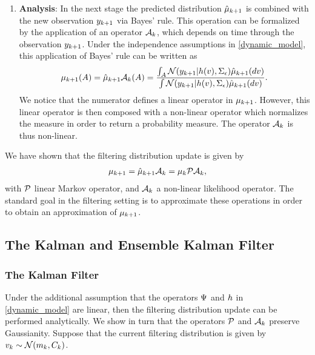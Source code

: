 \documentclass[12pt]{article}
\begin{document}
\begin{enumerate}
\item \textbf{Analysis}: In the next stage the predicted distribution $\predictMeas[\timeStep+1]$ is combined with the new observation $\ddataObs[\timeStep+1]$ via Bayes' rule.
This operation can be formalized by the application of an operator $\analysisOp$, which depends on time through the observation $\ddataObs[\timeStep+1]$. Under the independence 
assumptions in \ref{dynamic_model}, this application of Bayes' rule can be written as 
\begin{align*}
\filterMeas[\timeStep+1](A) = \predictMeas[\timeStep+1] \analysisOp(A) = \frac{\int_A \Gaussian(\ddataObs[\timeStep+1]|\obsOp(\state), \CovNoiseObs) \predictMeas[\timeStep+1](d\state)}{\int \Gaussian(\ddataObs[\timeStep+1]|\obsOp(\state), \CovNoiseObs) \predictMeas[\timeStep+1](d\state)}.
\end{align*}
We notice that the numerator defines a linear operator in $\filterMeas[\timeStep+1]$. However, this linear operator is then composed with a non-linear operator which normalizes the measure 
in order to return a probability measure. The operator $\analysisOp$ is thus non-linear. 
\end{enumerate}

We have shown that the filtering distribution update is given by 
\begin{align}
\filterMeas[\timeStep+1] = \predictMeas[\timeStep+1] \analysisOp = \filterMeas \predictOp \analysisOp,
\end{align}
with $\predictOp$ linear Markov operator, and $\analysisOp$ a non-linear likelihood operator. The standard goal in the filtering setting is to approximate these operations in order 
to obtain an approximation of $\filterMeas[\timeStep+1]$. 

\subsection{The Kalman and Ensemble Kalman Filter}

\subsubsection{The Kalman Filter}
Under the additional assumption that the operators $\fwdOne$ and $\obsOp$ in \ref{dynamic_model} are linear, then the filtering distribution update can be performed 
analytically. We show in turn that the operators $\predictOp$ and $\analysisOp$ preserve Gaussianity. Suppose that the current filtering distribution is given by 
$\dstate \sim \Gaussian(\stateMean, \stateCov)$. 
\end{document}
